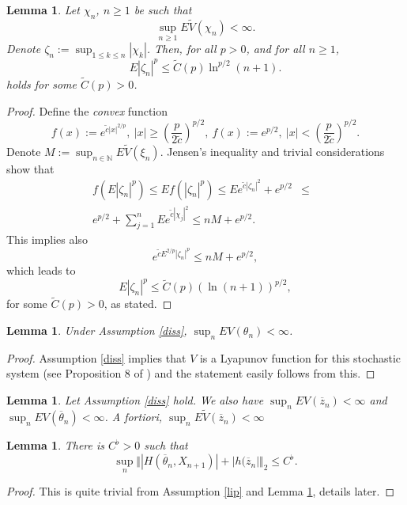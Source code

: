 \documentclass[a4paper,draft]{article}
\newtheorem{lemma}[theorem]{Lemma}
\begin{document}
\begin{lemma}\label{toranaga} Let $\chi_n$, $n\geq 1$ be such that 
$$
\sup_{n\geq 1} E\tilde{V}(\chi_n)<\infty.$$ 
Denote $\zeta_n:=\sup_{1\leq k\leq n}|\chi_k|$.
Then, for all $p>0$, and for all $n\geq 1$,
$$
E|\zeta_n|^p\leq \tilde{C}(p)\ln^{p/2}(n+1).
$$
holds for some $\tilde{C}(p)>0$.
\end{lemma}
\begin{proof} Define the \emph{convex} function 
$$
f(x):=e^{\tilde{c}|x|^{2/p}},\ |x|\geq \left(\frac{p}{2\tilde{c}}\right)^{p/2},\ f(x):=e^{p/2},\ |x|<\left(\frac{p}{2\tilde{c}}\right)^{p/2}.
$$
Denote $M:=\sup_{n\in\mathbb{N}}E\tilde{V}(\xi_n)$.
Jensen's inequality and trivial considerations show that
\begin{eqnarray*}
f(E|\zeta_n|^p)\leq Ef(|\zeta_n|^p)\leq Ee^{\tilde{c}|\zeta_n|^2}+
e^{p/2} &\leq&\\
e^{p/2}+\sum_{j=1}^n Ee^{\tilde{c}|\chi_j|^2} \leq nM +e^{p/2}.
\end{eqnarray*}
This implies also
$$
e^{\tilde{c}E^{2/p}|\zeta_n|^p}\leq nM +e^{p/2},
$$
which leads to
$$
E|\zeta_n|^p\leq \tilde{C}(p)(\ln(n+1))^{p/2},
$$
for some $\tilde{C}(p)>0$, as stated.
\end{proof}

\begin{lemma} Under Assumption \ref{diss},
$\sup_{n} EV(\theta_n)<\infty$.
\end{lemma}
\begin{proof} 
Assumption \ref{diss} implies that $V$ is a Lyapunov function for
this stochastic system (see Proposition 8 of \cite{unadjusted}) and the statement easily follows from this.
\end{proof}

\begin{lemma}\label{lavel} Let Assumption \ref{diss} hold.
We also have $\sup_n EV(\overline{z}_n)<\infty$ and $\sup_n EV(\overline{\theta}_n)<\infty$. {A fortiori},  
$\sup_n E\tilde{V}(\overline{z}_n)<\infty$
\end{lemma}

\begin{lemma}\label{easy}
There is $C^{\flat}>0$ such that
$$
\sup_{n}\Vert |H(\overline{\theta}_n,X_{n+1})|+|h(\overline{z}_n|\Vert_2\leq C^{\flat}.
$$
\end{lemma}
\begin{proof}
This is quite trivial from Assumption \ref{lip} and Lemma \ref{lavel}, details later.
\end{proof}
\end{document}
